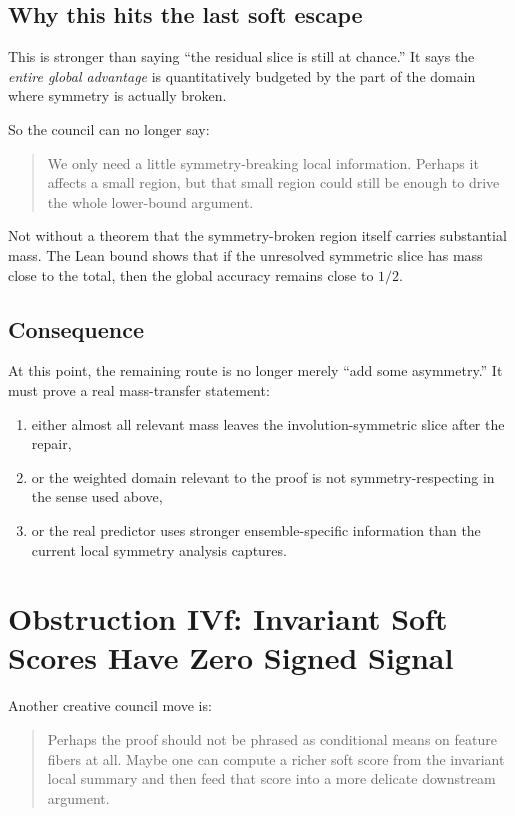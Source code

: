 \documentclass[11pt]{article}
\theoremstyle{remark}
\begin{document}
\subsection{Why this hits the last soft escape}

This is stronger than saying ``the residual slice is still at chance.''  It says the \emph{entire
global advantage} is quantitatively budgeted by the part of the domain where symmetry is actually
broken.

So the council can no longer say:
\begin{quote}
We only need a little symmetry-breaking local information.  Perhaps it affects a small region, but
that small region could still be enough to drive the whole lower-bound argument.
\end{quote}

Not without a theorem that the symmetry-broken region itself carries substantial mass.  The Lean
bound shows that if the unresolved symmetric slice has mass close to the total, then the global
accuracy remains close to \(1/2\).

\subsection{Consequence}

At this point, the remaining route is no longer merely ``add some asymmetry.''  It must prove a
real mass-transfer statement:
\begin{enumerate}[leftmargin=1.5em]
  \item either almost all relevant mass leaves the involution-symmetric slice after the repair,
  \item or the weighted domain relevant to the proof is not symmetry-respecting in the sense used
  above,
  \item or the real predictor uses stronger ensemble-specific information than the current local
  symmetry analysis captures.
\end{enumerate}

\section{Obstruction IVf: Invariant Soft Scores Have Zero Signed Signal}

Another creative council move is:
\begin{quote}
Perhaps the proof should not be phrased as conditional means on feature fibers at all.  Maybe one
can compute a richer soft score from the invariant local summary and then feed that score into a
more delicate downstream argument.
\end{quote}
\end{document}
